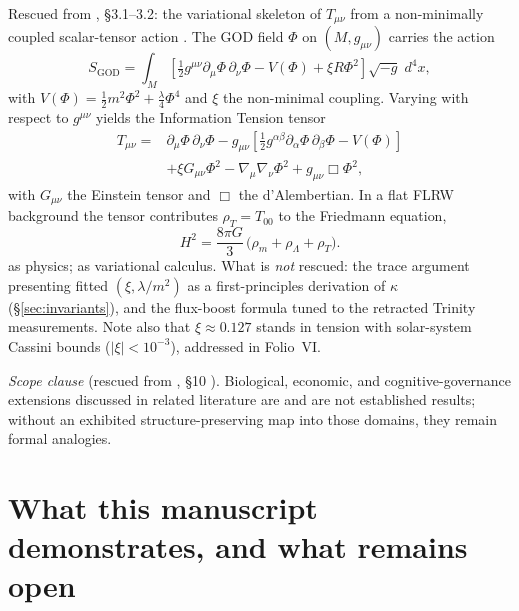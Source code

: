 \documentclass{alienfolio}
\begin{document}
Rescued from  \cite{rec20652234},
\S3.1--3.2: the variational skeleton of $T_{\mu\nu}$ from a
non-minimally coupled scalar-tensor action \cite{sotiriou10}. The GOD
field $\Phi$ on $(M, g_{\mu\nu})$ carries the action
\begin{equation}
S_{\mathrm{GOD}} = \int_{M} \left[ \tfrac{1}{2} g^{\mu\nu}
\partial_{\mu}\Phi\,\partial_{\nu}\Phi - V(\Phi)
+ \xi R \Phi^{2} \right] \sqrt{-g}\; d^{4}x,
\label{eq:action}
\end{equation}
with $V(\Phi) = \tfrac{1}{2}m^{2}\Phi^{2} + \tfrac{\lambda}{4}\Phi^{4}$
and $\xi$ the non-minimal coupling. Varying with respect to
$g^{\mu\nu}$ yields the Information Tension tensor
\begin{equation}
\begin{aligned}
T_{\mu\nu} ={}& \partial_{\mu}\Phi\,\partial_{\nu}\Phi
- g_{\mu\nu}\left[ \tfrac{1}{2} g^{\alpha\beta}
\partial_{\alpha}\Phi\,\partial_{\beta}\Phi - V(\Phi) \right] \\
& + \xi G_{\mu\nu}\Phi^{2} - \nabla_{\mu}\nabla_{\nu}\Phi^{2}
+ g_{\mu\nu}\Box\Phi^{2},
\end{aligned}
\label{eq:Tmunu}
\end{equation}
with $G_{\mu\nu}$ the Einstein tensor and $\Box$ the d'Alembertian.
In a flat FLRW background the tensor contributes
$\rho_{T} = T_{00}$ to the Friedmann equation,
\begin{equation}
H^{2} = \frac{8\pi G}{3}\,\bigl(\rho_{m} + \rho_{\Lambda} + \rho_{T}\bigr).
\label{eq:friedmann}
\end{equation}
 as physics;  as variational
calculus. What is \emph{not} rescued: the trace argument presenting fitted
$(\xi, \lambda/m^{2})$ as a first-principles derivation of $\kappa$
(\S\ref{sec:invariants}), and the flux-boost formula tuned to the
retracted Trinity measurements. Note also that $\xi \approx 0.127$ stands
in tension with solar-system Cassini bounds ($|\xi| < 10^{-3}$),
addressed in Folio~VI.

\emph{Scope clause} (rescued from , \S10
\cite{rec20652234}). Biological, economic, and cognitive-governance
extensions discussed in related literature are  and are not established results;
without an exhibited structure-preserving map into those domains, they
remain formal analogies.

\goldrule

\section{What this manuscript demonstrates, and what remains open}
\label{sec:demonstrates}
\end{document}
